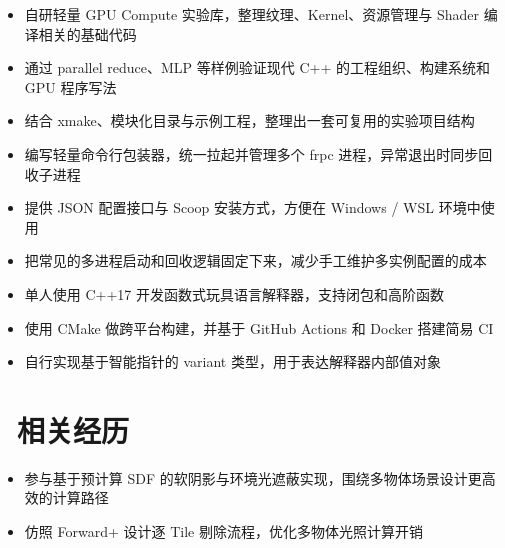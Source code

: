 \documentclass{resume}
\begin{document}
\begin{onehalfspacing}
\begin{itemize}
  \item 自研轻量 GPU Compute 实验库，整理纹理、Kernel、资源管理与 Shader 编译相关的基础代码
  \item 通过 parallel reduce、MLP 等样例验证现代 C++ 的工程组织、构建系统和 GPU 程序写法
  \item 结合 xmake、模块化目录与示例工程，整理出一套可复用的实验项目结构
\end{itemize}
\end{onehalfspacing}

\begin{onehalfspacing}
\begin{itemize}
  \item 编写轻量命令行包装器，统一拉起并管理多个 frpc 进程，异常退出时同步回收子进程
  \item 提供 JSON 配置接口与 Scoop 安装方式，方便在 Windows / WSL 环境中使用
  \item 把常见的多进程启动和回收逻辑固定下来，减少手工维护多实例配置的成本
\end{itemize}
\end{onehalfspacing}

\begin{onehalfspacing}
\begin{itemize}
  \item 单人使用 C++17 开发函数式玩具语言解释器，支持闭包和高阶函数
  \item 使用 CMake 做跨平台构建，并基于 GitHub Actions 和 Docker 搭建简易 CI
  \item 自行实现基于智能指针的 variant 类型，用于表达解释器内部值对象
\end{itemize}
\end{onehalfspacing}

\section{\faUsers\ 相关经历}

\begin{onehalfspacing}
\begin{itemize}
  \item 参与基于预计算 SDF 的软阴影与环境光遮蔽实现，围绕多物体场景设计更高效的计算路径
  \item 仿照 Forward+ 设计逐 Tile 剔除流程，优化多物体光照计算开销
\end{itemize}
\end{onehalfspacing}
\end{document}

